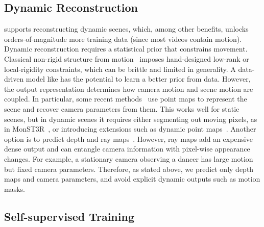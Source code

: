 \subsection{Dynamic Reconstruction}%
\label{sec:dynamic-reconstruction}

\method supports reconstructing dynamic scenes, which, among other benefits, unlocks orders-of-magnitude more training data (since most videos contain motion).
Dynamic reconstruction requires a statistical prior that constrains movement.
Classical non-rigid structure from motion~\cite{bregler00recovering, dai14a-simple,taylor10non-rigid} imposes hand-designed low-rank or local-rigidity constraints, which can be brittle and limited in generality.
A data-driven model like \method has the potential to learn a better prior from data.
However, the output representation determines how camera motion and scene motion are coupled. 
In particular, some recent methods~\cite{wang24dust3r:} use point maps to represent the scene and recover camera parameters from them.
This works well for static scenes, but in dynamic scenes it requires either segmenting out moving pixels, as in MonST3R~\cite{zhang24monst3r:}, or introducing extensions such as dynamic point maps~\cite{sucar25dynamic,sucar26v-dpm}.
Another option is to predict depth and ray maps~\cite{lin25depth}.
However, ray maps add an expensive dense output and can entangle camera information with pixel-wise appearance changes.
For example, a stationary camera observing a dancer has large motion but fixed camera parameters.
Therefore, as stated above, we predict only depth maps and camera parameters, and avoid explicit dynamic outputs such as motion masks. 


\subsection{Self-supervised Training}%
\label{sec:self-supervised-training}

